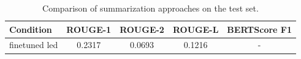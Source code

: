 \begin{table}[h]
\centering
\begin{tabular}{lcccc}
\hline
\textbf{Condition} & \textbf{ROUGE-1} & \textbf{ROUGE-2} & \textbf{ROUGE-L} & \textbf{BERTScore F1} \\
\hline
finetuned led & 0.2317 & 0.0693 & 0.1216 & - \\
\hline
\end{tabular}
\caption{Comparison of summarization approaches on the test set.}
\label{tab:results}
\end{table}
